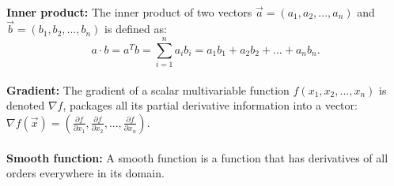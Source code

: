 \documentclass[12pt]{article}
\begin{document}
\\\textbf{Inner product:} The inner product of two vectors $\vec{a} = (a_1, a_2,..., a_n)$ and $\vec{b} = (b_1, b_2,..., b_n)$ is defined as:
$$a \cdot b = a^T b =\sum_{i=1}^{n}a_i b_i = a_1b_1+a_2b_2+...+a_n b_n.$$
\\\textbf{Gradient:} The gradient of a scalar multivariable function $f(x_1, x_2,...,x_n)$ is denoted $\nabla f$, packages all its partial derivative information into a vector: $\nabla f(\vec{x}) = (\frac{\partial{f}}{\partial{x_1}},\frac{\partial{f}}{\partial{x_2}},...,\frac{\partial{f}}{\partial{x_n}})$.\\
\\\textbf{Smooth function:} A smooth function is a function that has derivatives of all orders everywhere in its domain.
 
\newpage
\end{document}
